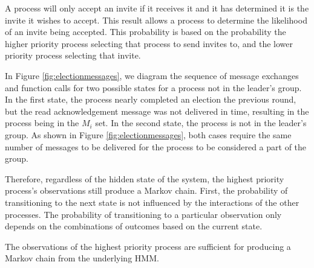A process will only accept an invite if it receives it and it has determined it is the invite it wishes to accept.
This result allows a process to determine the likelihood of an invite being accepted.
This probability is based on the probability the higher priority process selecting that process to send invites to, and the lower priority process selecting that invite.

In Figure \ref{fig:electionmessages}, we diagram the sequence of message exchanges and function calls for two possible states for a process not in the leader's group.
In the first state, the process nearly completed an election the previous round, but the read acknowledgement message was not delivered in time, resulting in the process being in the $M_i$ set.
In the second state, the process is not in the leader's group.
As shown in Figure \ref{fig:electionmessages}, both cases require the same number of messages to be delivered for the process to be considered a part of the group.

Therefore, regardless of the hidden state of the system, the highest priority process's observations still produce a Markov chain.
First, the probability of transitioning to the next state is not influenced by the interactions of the other processes.
The probability of transitioning to a particular observation only depends on the combinations of outcomes based on the current state.

\begin{thm}
    The observations of the highest priority process are sufficient for producing a Markov chain from the underlying \ac{HMM}.
\end{thm}

